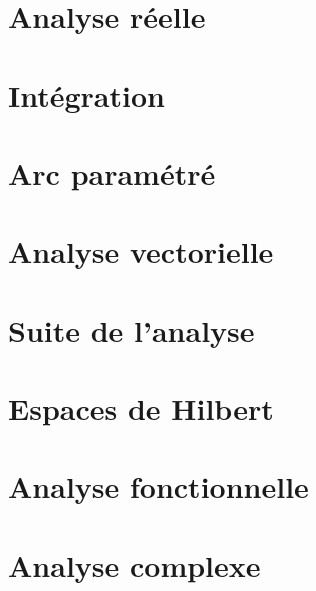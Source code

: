 \chapter{Analyse réelle}







\chapter{Intégration}






\chapter{Arc paramétré}


\chapter{Analyse vectorielle}



\chapter{Suite de l'analyse}







\chapter{Espaces de Hilbert}


\chapter{Analyse fonctionnelle}



\chapter{Analyse complexe}          \label{ChapICHIooXbLccl}




